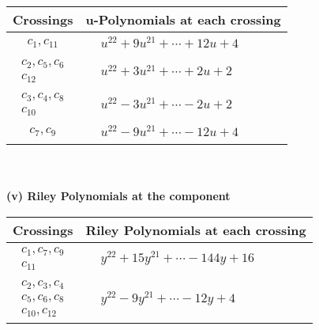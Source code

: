 \documentclass[1p]{elsarticle_modified}
\theoremstyle{definition}
\begin{document}
\begin{tabular}{m{50pt}|m{274pt}}
Crossings & \hspace{64pt}u-Polynomials at each crossing \\
\hline $$\begin{aligned}c_{1},c_{11}\end{aligned}$$&$\begin{aligned}
&u^{22}+9 u^{21}+\cdots+12 u+4
\end{aligned}$\\
\hline $$\begin{aligned}c_{2},c_{5},c_{6}\\c_{12}\end{aligned}$$&$\begin{aligned}
&u^{22}+3 u^{21}+\cdots+2 u+2
\end{aligned}$\\
\hline $$\begin{aligned}c_{3},c_{4},c_{8}\\c_{10}\end{aligned}$$&$\begin{aligned}
&u^{22}-3 u^{21}+\cdots-2 u+2
\end{aligned}$\\
\hline $$\begin{aligned}c_{7},c_{9}\end{aligned}$$&$\begin{aligned}
&u^{22}-9 u^{21}+\cdots-12 u+4
\end{aligned}$\\
\hline
\end{tabular}\\~\\
\newpage\renewcommand{\arraystretch}{1}
\flushleft \textbf{(v) Riley Polynomials at the component}\newline \\
\begin{tabular}{m{50pt}|m{274pt}}
Crossings & \hspace{64pt}Riley Polynomials at each crossing \\
\hline $$\begin{aligned}c_{1},c_{7},c_{9}\\c_{11}\end{aligned}$$&$\begin{aligned}
&y^{22}+15 y^{21}+\cdots-144 y+16
\end{aligned}$\\
\hline $$\begin{aligned}c_{2},c_{3},c_{4}\\c_{5},c_{6},c_{8}\\c_{10},c_{12}\end{aligned}$$&$\begin{aligned}
&y^{22}-9 y^{21}+\cdots-12 y+4
\end{aligned}$\\
\hline
\end{tabular}\\~\\
\end{document}
